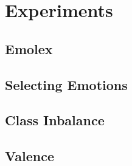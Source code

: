 \section{Experiments}\label{sec:Experiments}
\subsection{Emolex}\label{sub:Emolex}
\subsection{Selecting Emotions}\label{sub:Selecting Emotions}
\subsection{Class Inbalance}\label{sub:Class Inbalance}
\subsection{Valence}\label{sub:Valence}
